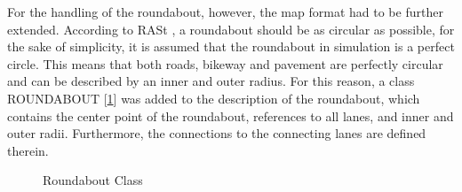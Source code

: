 \documentclass[11pt,oneside,openright]{mpreport}
\begin{document}
For the handling of the roundabout, however, the map format had to be further extended. According to \ac{RASt} \cite{rast06}, a roundabout should be as circular as possible, 
for the sake of simplicity, it is assumed that the roundabout in simulation is a perfect circle. This means that both roads,
bikeway and pavement are perfectly circular and can be described by an inner and outer radius. For this reason, a class ROUNDABOUT [\cref{roundabout_class}] was added to the description of the roundabout,
which contains the center point of the roundabout, references to all lanes, and inner and outer radii. Furthermore, the connections to the connecting lanes are defined therein.

\begin{figure}[!ht]
\begin{center}
\caption{Roundabout Class}
\label{roundabout_class}
\end{center}
\end{figure}
\end{document}
